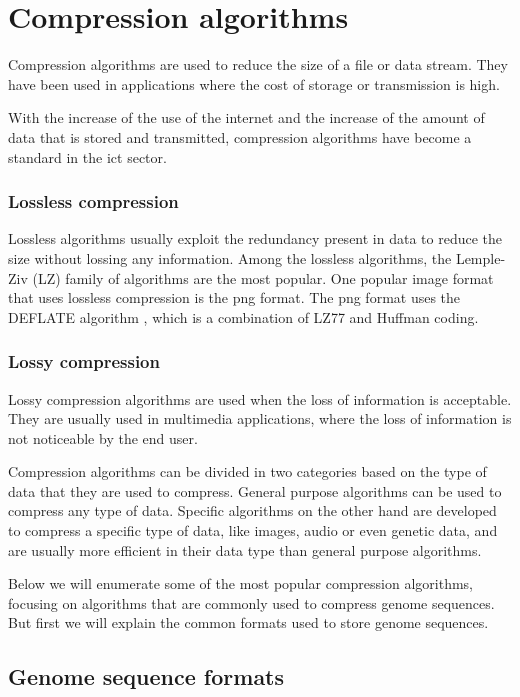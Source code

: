 \section{Compression algorithms}

Compression algorithms are used to reduce the size of a file or data stream. They have been used in applications where the cost of storage or transmission is high.

With the increase of the use of the internet and the increase of the amount of data that is stored and transmitted, compression algorithms have become a standard in the \ac{ict} sector.

\subsubsection{Lossless compression}

Lossless algorithms usually exploit the redundancy present in data to reduce the size without lossing any information. Among the lossless algorithms, the Lemple-Ziv (LZ) family of algorithms are the most popular. One popular image format that uses lossless compression is the \ac{png} format. The \ac{png} format uses the DEFLATE algorithm \cite{rfc1951}, which is a combination of LZ77 and Huffman coding.

\subsubsection{Lossy compression}

Lossy compression algorithms are used when the loss of information is acceptable. They are usually used in multimedia applications, where the loss of information is not noticeable by the end user.

Compression algorithms can be divided in two categories based on the type of data that they are used to compress. General purpose algorithms can be used to compress any type of data. Specific algorithms on the other hand are developed to compress a specific type of data, like images, audio or even genetic data, and are usually more efficient in their data type than general purpose algorithms.

Below we will enumerate some of the most popular compression algorithms, focusing on algorithms that are commonly used to compress genome sequences. But first we will explain the common formats used to store genome sequences.

\subsection{Genome sequence formats}

